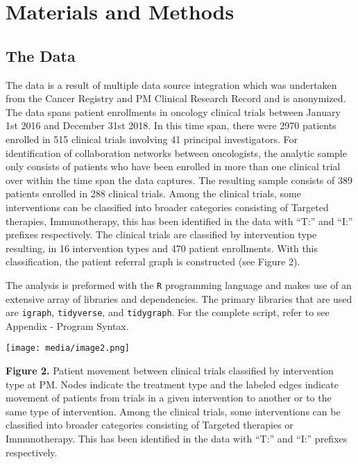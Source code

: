 \section{Materials and Methods}\label{materials-and-methods}

\subsection{The Data}\label{the-data}

The data is a result of multiple data source integration which was
undertaken from the Cancer Registry and PM Clinical Research Record and
is anonymized. The data spans patient enrollments in oncology clinical
trials between January 1st 2016 and December 31st 2018. In this time
span, there were 2970 patients enrolled in 515 clinical trials involving
41 principal investigators. For identification of collaboration networks
between oncologists, the analytic sample only consists of patients who
have been enrolled in more than one clinical trial over within the time
span the data captures. The resulting sample consists of 389 patients
enrolled in 288 clinical trials. Among the clinical trials, some
interventions can be classified into broader categories consisting of
Targeted therapies, Immunotherapy, this has been identified in the data
with ``T:'' and ``I:'' prefixes respectively. The clinical trials are
classified by intervention type resulting, in 16 intervention types and
470 patient enrollments. With this classification, the patient referral
graph is constructed (see Figure 2).

The analysis is preformed with the \texttt{R} programming language and
makes use of an extensive array of libraries and dependencies. The
primary libraries that are used are \texttt{igraph}, \texttt{tidyverse},
and \texttt{tidygraph}. For the complete script, refer to see Appendix -
Program Syntax.

\texttt{[image: media/image2.png]}

\textbf{Figure 2.} Patient movement between clinical trials classified
by intervention type at PM. Nodes indicate the treatment type and the
labeled edges indicate movement of patients from trials in a given
intervention to another or to the same type of intervention. Among the
clinical trials, some interventions can be classified into broader
categories consisting of Targeted therapies or Immunotherapy. This has
been identified in the data with ``T:'' and ``I:'' prefixes
respectively.

